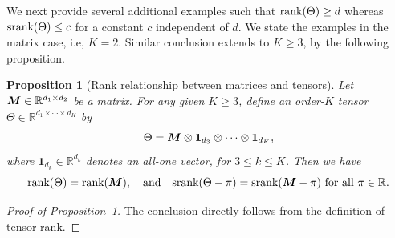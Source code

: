 \documentclass[11pt]{article}
\theoremstyle{plain}
\newtheorem{prop}{Proposition}[section]
\theoremstyle{definition}
\def\srank{\textup{srank}}
\def\rank{\textup{rank}}
\begin{document}
We next provide several additional examples such that $\rank(\Theta)\geq d$ whereas $\srank(\Theta)\leq c$ for a constant $c$ independent of $d$. We state the examples in the matrix case, i.e, $K=2$. Similar conclusion extends to $K\geq 3$, by the following proposition. 
\begin{prop}[Rank relationship between matrices and tensors]\label{prop:connection}Let $\bm M\in\mathbb{R}^{d_1\times d_2}$ be a matrix. For any given $K\geq 3$, define an order-$K$ tensor $\Theta\in\mathbb{R}^{d_1\times \cdots \times d_K}$ by
\[
\Theta=\bm M\otimes \mathbf{1}_{d_3}\otimes \cdots \otimes \mathbf{1}_{d_K},
\] 
where $\mathbf{1}_{d_k}\in\mathbb{R}^{d_k}$ denotes an all-one vector, for $3\leq k\leq K$. Then we have
\[
\rank(\Theta)=\rank(\mM),\quad \text{and}\quad \srank(\Theta-\pi)=\srank(\mM-\pi) \ \text{for all $\pi\in\mathbb{R}$}.
\] 
\end{prop}
\begin{proof}[Proof of Proposition~\ref{prop:connection}]
The conclusion directly follows from the definition of tensor rank. 
\end{proof}
\end{document}
